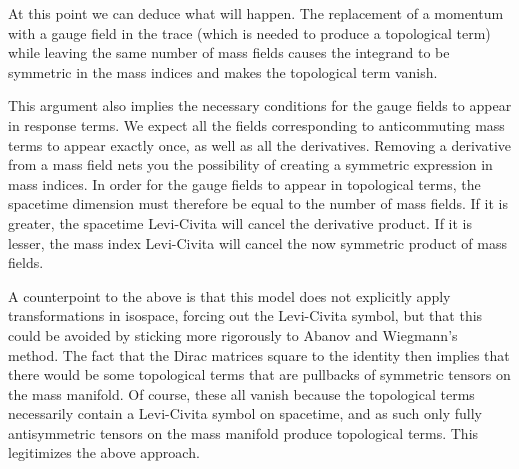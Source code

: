 At this point we can deduce what will happen. The replacement of a momentum with a gauge field in the trace (which is needed to produce a topological term) while leaving the same number of mass fields causes the integrand to be symmetric in the mass indices and makes the topological term vanish.

This argument also implies the necessary conditions for the gauge fields to appear in response terms. We expect all the fields corresponding to anticommuting mass terms to appear exactly once, as well as all the derivatives. Removing a derivative from a mass field nets you the possibility of creating a symmetric expression in mass indices. In order for the gauge fields to appear in topological terms, the spacetime dimension must therefore be equal to the number of mass fields. If it is greater, the spacetime Levi-Civita will cancel the derivative product. If it is lesser, the mass index Levi-Civita will cancel the now symmetric product of mass fields.

A counterpoint to the above is that this model does not explicitly apply transformations in isospace, forcing out the Levi-Civita symbol, but that this could be avoided by sticking more rigorously to Abanov and Wiegmann's method. The fact that the Dirac matrices square to the identity then implies that there would be some topological terms that are pullbacks of symmetric tensors on the mass manifold. Of course, these all vanish because the topological terms necessarily contain a Levi-Civita symbol on spacetime, and as such only fully antisymmetric tensors on the mass manifold produce topological terms. This legitimizes the above approach.

